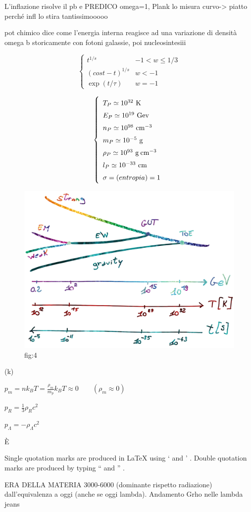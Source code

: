 L'inflazione risolve il pb e PREDICO omega=1, Plank lo misura
curvo-> piatto perché infl lo stira tantissimooooo

pot chimico dice come l'energia interna reagisce ad una variazione di densità
omega b storicamente con fotoni galassie, poi nucleosintesiii

\begin{equation}
    \left\{\begin{matrix}
        t^{1/s} & -1 < w \le 1/3\\ 
        (cost-t)^{1/s} & w<-1 \\
        \exp (t/\tau)&  w=-1
       \end{matrix}\right.
\end{equation}

\begin{equation}\left\{
    \def\arraystretch{1.5}
        \begin{array}{ll}
        T_P \simeq 10^{32}~\mathrm{K} \\
        E_P \simeq 10^{19}~\mathrm{Gev} \\
        n_P \simeq 10^{98}~\mathrm{cm}^{-3} \\
        m_P \simeq 10^{-5}~\mathrm{g} \\
        \rho_P \simeq 10^{93}~\mathrm{g\: cm}^{-3}  \\
        l_P \simeq 10^{-33}~\mathrm{cm} \\
        \sigma = (entropia) = 1 
    \end{array}\right. \label{eq:unitaplanckiane}
\end{equation}


\begin{figure}[H]
    \centering
    \includegraphics[width=.55 \textwidth]{Pictures/5/fasiprimordiali.png}
    \caption{fig:4}
\end{figure}

\hslash
{}(k)

\begin{example}
$p_m=nk_B T = \frac{\rho_m}{m_p}k_B T \approx 0 \qquad ( \rho_m \approx 0) $
\end{example}
\begin{example}
$p_R=\frac{1}{3} \rho_R c^2 $
\end{example}
\begin{example}
$p_\Lambda= -\rho_\Lambda c^2 $
\end{example}



È

Single quotation marks are produced in LaTeX using ` and ' . Double quotation marks are produced by typing `` and '' .



ERA DELLA MATERIA 3000-6000 (dominante rispetto radiazione)  dall'equivalenza a oggi (anche se oggi lambda).
Andamento Grho nelle lambda jeans